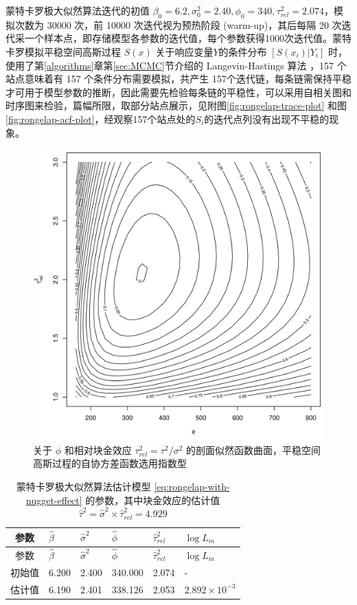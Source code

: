 \documentclass[12pt,a4paper,UTF8,twoside]{book}
\theoremstyle{definition}
\theoremstyle{definition}
\theoremstyle{definition}
\theoremstyle{remark}
\begin{document}
蒙特卡罗极大似然算法迭代的初值
\(\beta_{0} = 6.2,\sigma^2_{0} = 2.40,\phi_{0} = 340,\tau^2_{rel} = 2.074\)，模拟次数为
30000 次，前 10000 次迭代视为预热阶段 (warm-up)，其后每隔 20
次迭代采一个样本点，即存储模型各参数的迭代值，每个参数获得1000次迭代值。蒙特卡罗模拟平稳空间高斯过程
\(S(x)\) 关于响应变量\(Y\)的条件分布 \([S(x_i)|Y_i]\)
时，使用了第\ref{algorithms}章第\ref{sec:MCMC}节介绍的 Langevin-Hastings
算法 \citep{Omiros2003}，157 个站点意味着有 157
个条件分布需要模拟，共产生
157个迭代链，每条链需保持平稳才可用于模型参数的推断，因此需要先检验每条链的平稳性，可以采用自相关图和时序图来检验，篇幅所限，取部分站点展示，见附图\ref{fig:rongelap-trace-plot}
和图
\ref{fig:rongelap-acf-plot}，经观察157个站点处的\(S_i\)的迭代点列没有出现不平稳的现象。

\begin{figure}

{\centering \includegraphics[width=0.7\linewidth]{figures/profile-phitausq} 

}

\caption{关于 \(\phi\) 和相对块金效应
\(\tau^2_{rel} = \tau^2 / \sigma^2\)
的剖面似然函数曲面，平稳空间高斯过程的自协方差函数选用指数型}\label{fig:profile-phi-tausq}
\end{figure}





\begin{longtable}[]{@{}clllll@{}}
\caption{\label{tab:rongelap-mcml-result} 蒙特卡罗极大似然算法估计模型
\eqref{eq:rongelap-with-nugget-effect} 的参数，其中块金效应的估计值
\(\hat{\tau}^2 = \hat{\sigma}^{2} \times \hat{\tau}^2_{rel} = 4.929\)}\tabularnewline
\toprule
参数 & \(\hat{\beta}\) & \(\hat{\sigma}^{2}\) & \(\hat{\phi}\) &
\(\hat{\tau}^2_{rel}\) & \(\log L_{m}\)\tabularnewline
\midrule
\endfirsthead
\toprule
参数 & \(\hat{\beta}\) & \(\hat{\sigma}^{2}\) & \(\hat{\phi}\) &
\(\hat{\tau}^2_{rel}\) & \(\log L_{m}\)\tabularnewline
\midrule
\endhead
初始值 & 6.200 & 2.400 & 340.000 & 2.074 & -\tabularnewline
估计值 & 6.190 & 2.401 & 338.126 & 2.053 &
\(2.892 \times 10^{-3}\)\tabularnewline
\bottomrule
\end{longtable}
\end{document}
